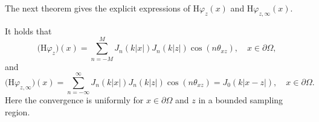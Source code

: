 \documentclass[final]{siamltex}
\begin{document}
The next theorem gives the explicit expressions of $\mathrm{H} \varphi_z (x)$ and $\mathrm{H} \varphi_{z,\infty} (x)$.

\begin{theorem} \label{H varphi theorem}
It holds that
\begin{equation} \label{H varphi eqn}
\Big( \mathrm{H} \varphi_z \Big) (x) =  \sum_{n=-M}^M J_n(k|x|) J_n(k|z|) \cos(n\theta_{xz}), \quad x\in \partial \Omega,
\end{equation}
and
\begin{equation}  \label{H varphi infty eqn}
\Big( \mathrm{H} \varphi_{z,\infty} \Big) (x) =  \sum_{n=-\infty}^\infty J_n(k|x|) J_n(k|z|) \cos(n\theta_{xz}) = J_0(k|x-z|), \quad x\in \partial \Omega.
\end{equation}
Here the convergence is uniformly for $x\in \partial \Omega$ and $z$ in a bounded sampling region. 
\end{theorem}
\end{document}
